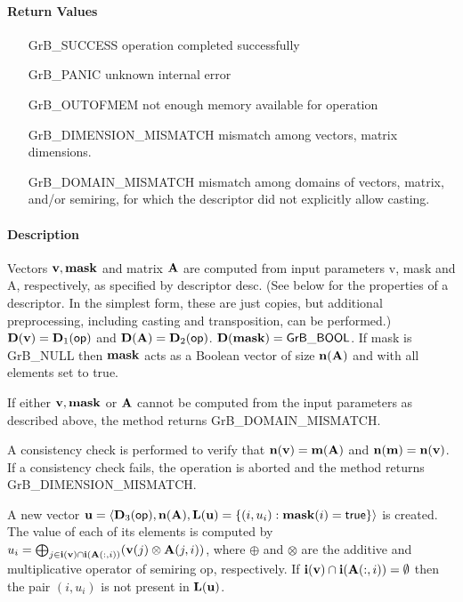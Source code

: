 \paragraph{Return Values}

\begin{itemize}[leftmargin=2.1in]
\item[{\sf GrB\_SUCCESS}]             operation completed successfully
\item[{\sf GrB\_PANIC}]               unknown internal error
\item[{\sf GrB\_OUTOFMEM}]            not enough memory available for operation
\item[{\sf GrB\_DIMENSION\_MISMATCH}] mismatch among vectors, matrix dimensions.
\item[{\sf GrB\_DOMAIN\_MISMATCH}]    mismatch among domains of vectors, matrix, and/or semiring, for which the descriptor did not explicitly allow casting.
\end{itemize}

\paragraph{Description}

Vectors ${\bf v}, {\bf mask}$ and matrix ${\bf A}$ are computed from
input parameters {\sf v}, {\sf mask} and {\sf A}, respectively, as specified
by descriptor {\sf desc}. (See below for the properties of a descriptor. In
the simplest form, these are just copies, but additional preprocessing,
including casting and transposition, can be performed.)  $\bold{D}({\bf v}) =
\bold{D}_1({\sf op})$ and $\bold{D}({\bf A}) = \bold{D}_2({\sf op})$.
$\bold{D}({\bf mask}) = {\sf GrB\_BOOL}$.  If {\sf mask} is {\sf GrB\_NULL}
then ${\bf mask}$ acts as a Boolean vector of size $\bold{n}({\bf A})$
and with all elements set to {\sf true}.

If either ${\bf v}, {\bf mask}$ or ${\bf A}$ cannot be computed
from the input parameters as described above, the method returns {\sf
GrB\_DOMAIN\_MISMATCH}.

A consistency check is performed to verify that $\bold{n}({\bf v})
= \bold{m}({\bf A})$ and $\bold{n}({\bf m}) =
\bold{n}({\bf v})$. If a consistency check fails, the operation is
aborted and the method returns {\sf GrB\_DIMENSION\_MISMATCH}.

A new vector ${\bf u} = \langle \bold{D}_3({\sf op}),
\bold{n}({\bf A}), \bold{L}({\bf u}) = \{(i,u_i) : {\bf mask}(i)
= {\sf true} \} \rangle$ is created.  The value of each of its elements
is computed by $u_i = \bigoplus_{j \in {\bf i}({\bf v}) \cap
{\bf i}({\bf A}(:,i))} ({\bf v}(j) \otimes {\bf A}(j,i))$,
where $\oplus$ and $\otimes$ are the additive and multiplicative
operator of semiring {\sf op}, respectively.  If ${\bf i}({\bf v})
\cap {\bf i}({\bf A}(:,i)) = \emptyset$ then the pair $(i,u_i)$
is not present in $\bold{L}({\bf u})$.


